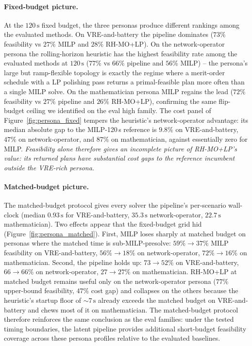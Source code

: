 \documentclass{article}
\begin{document}
\paragraph{Fixed-budget picture.} At the $120\,\mathrm{s}$ fixed budget, the three personas produce different rankings among the evaluated methods. On VRE-and-battery the pipeline dominates ($73\%$ feasibility vs $27\%$ MILP and $28\%$ RH-MO+LP). On the network-operator persona the rolling-horizon heuristic has the highest feasibility rate among the evaluated methods at $120\,\mathrm{s}$ ($77\%$ vs $66\%$ pipeline and $56\%$ MILP) -- the persona's large but ramp-flexible topology is exactly the regime where a merit-order schedule with a LP polishing pass returns a primal-feasible plan more often than a single MILP solve. On the mathematician persona MILP regains the lead ($72\%$ feasibility vs $27\%$ pipeline and $26\%$ RH-MO+LP), confirming the same flip-budget ceiling we identified on the eval high family. The cost panel of Figure~\ref{fig:persona_fixed} tempers the heuristic's network-operator advantage: its median absolute gap to the MILP-120\,s reference is $9.8\%$ on VRE-and-battery, $47\%$ on network-operator, and $87\%$ on mathematician, against essentially zero for MILP. \emph{Feasibility alone therefore gives an incomplete picture of RH-MO+LP's value: its returned plans have substantial cost gaps to the reference incumbent outside the VRE-rich persona.}

\paragraph{Matched-budget picture.} The matched-budget protocol gives every solver the pipeline's per-scenario wall-clock (median $0.93\,\mathrm{s}$ for VRE-and-battery, $35.3\,\mathrm{s}$ network-operator, $22.7\,\mathrm{s}$ mathematician). Two effects appear that the fixed-budget grid hid (Figure~\ref{fig:persona_matched}). First, MILP loses sharply at matched budget on personas where the matched time is sub-MILP-presolve: $59\% \to 37\%$ MILP feasibility on VRE-and-battery, $56\% \to 18\%$ on network-operator, $72\% \to 16\%$ on mathematician. Second, the pipeline holds up: $73 \to 52\%$ on VRE-and-battery, $66 \to 66\%$ on network-operator, $27 \to 27\%$ on mathematician. RH-MO+LP at matched budget remains useful only on the network-operator persona ($77\%$ upper-bound feasibility, $47\%$ cost gap) and collapses on the others because the heuristic's startup floor of $\sim 7\,\mathrm{s}$ already exceeds the matched budget on VRE-and-battery and chews most of it on mathematician. The matched-budget protocol therefore reinforces the same conclusion as the eval families: under the tested timing boundaries, the latent pipeline provides additional short-budget feasibility coverage across these persona profiles relative to the evaluated baselines.
\end{document}
